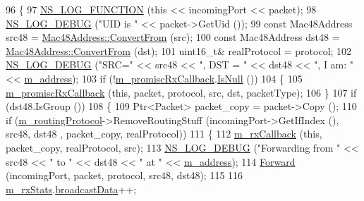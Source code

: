 \begin{DoxyCode}
96 \{
97   \hyperlink{log-macros-disabled_8h_a90b90d5bad1f39cb1b64923ea94c0761}{NS\_LOG\_FUNCTION} (\textcolor{keyword}{this} << incomingPort << packet);
98   \hyperlink{group__logging_ga413f1886406d49f59a6a0a89b77b4d0a}{NS\_LOG\_DEBUG} (\textcolor{stringliteral}{"UID is "} << packet->GetUid ());
99   \textcolor{keyword}{const} Mac48Address src48 = \hyperlink{classns3_1_1Mac48Address_a911ce13603a9ef837545a032b6523ae4}{Mac48Address::ConvertFrom} (src);
100   \textcolor{keyword}{const} Mac48Address dst48 = \hyperlink{classns3_1_1Mac48Address_a911ce13603a9ef837545a032b6523ae4}{Mac48Address::ConvertFrom} (dst);
101   uint16\_t& realProtocol = protocol;
102   \hyperlink{group__logging_ga413f1886406d49f59a6a0a89b77b4d0a}{NS\_LOG\_DEBUG} (\textcolor{stringliteral}{"SRC="} << src48 << \textcolor{stringliteral}{", DST = "} << dst48 << \textcolor{stringliteral}{", I am: "} << 
      \hyperlink{classns3_1_1MeshPointDevice_abdd42cdf967d3b75cc32e20f74e10c51}{m\_address});
103   \textcolor{keywordflow}{if} (!\hyperlink{classns3_1_1MeshPointDevice_a9d8b17d5fc37167fea51c64d21c4f7eb}{m\_promiscRxCallback}.\hyperlink{classns3_1_1Callback_aa8e27826badbf37f84763f36f70d9b54}{IsNull} ())
104     \{
105       \hyperlink{classns3_1_1MeshPointDevice_a9d8b17d5fc37167fea51c64d21c4f7eb}{m\_promiscRxCallback} (\textcolor{keyword}{this}, packet, protocol, src, dst, packetType);
106     \}
107   \textcolor{keywordflow}{if} (dst48.IsGroup ())
108     \{
109       Ptr<Packet> packet\_copy = packet->Copy ();
110       \textcolor{keywordflow}{if} (\hyperlink{classns3_1_1MeshPointDevice_ac704fc10d4ed26d009f8bbfe71049d45}{m\_routingProtocol}->RemoveRoutingStuff (incomingPort->GetIfIndex (), src48, dst48
      , packet\_copy, realProtocol))
111         \{
112           \hyperlink{classns3_1_1MeshPointDevice_a7655ae549d9f2faf860b4051259c6509}{m\_rxCallback} (\textcolor{keyword}{this}, packet\_copy, realProtocol, src);
113           \hyperlink{group__logging_ga413f1886406d49f59a6a0a89b77b4d0a}{NS\_LOG\_DEBUG} (\textcolor{stringliteral}{"Forwarding from "} << src48 << \textcolor{stringliteral}{" to "} << dst48 << \textcolor{stringliteral}{" at "} << 
      \hyperlink{classns3_1_1MeshPointDevice_abdd42cdf967d3b75cc32e20f74e10c51}{m\_address});
114           \hyperlink{classns3_1_1MeshPointDevice_a8c13c74a516103913d7e852159e47d7d}{Forward} (incomingPort, packet, protocol, src48, dst48);
115 
116           \hyperlink{classns3_1_1MeshPointDevice_aa10107ad81c4b24d391dcd8520152bf8}{m\_rxStats}.\hyperlink{structns3_1_1MeshPointDevice_1_1Statistics_a63f262171b72e2841c8d8020962aebbe}{broadcastData}++;

\end{DoxyCode}
